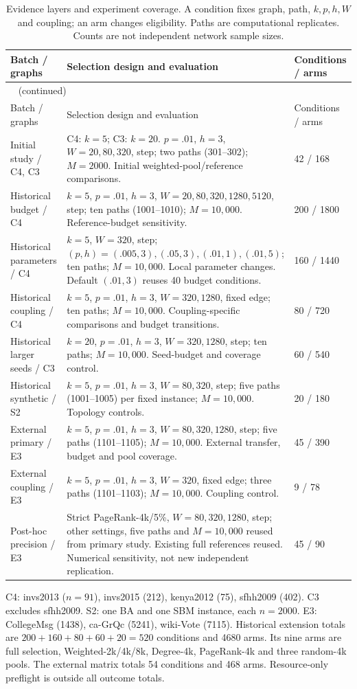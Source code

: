 \begin{longtable}{p{.23\linewidth}p{.51\linewidth}p{.14\linewidth}}
\caption{Evidence layers and experiment coverage. A condition fixes graph, path, $k,p,h,W$ and coupling; an arm changes eligibility. Paths are computational replicates. Counts are not independent network sample sizes.}\label{tab:hist-coverage}\\
\toprule Batch / graphs & Selection design and evaluation & Conditions / arms\\\midrule\endfirsthead
\multicolumn{3}{l}{\tablename~\thetable{} (continued)}\\\toprule
Batch / graphs & Selection design and evaluation & Conditions / arms\\\midrule\endhead\bottomrule\endfoot
Initial study / C4, C3 & C4: $k=5$; C3: $k=20$. $p=.01$, $h=3$, $W=20,80,320$, step; two paths (301--302); $M=2000$. Initial weighted-pool/reference comparisons. & 42 / 168\\
Historical budget / C4 & $k=5$, $p=.01$, $h=3$, $W=20,80,320,1280,5120$, step; ten paths (1001--1010); $M=10{,}000$. Reference-budget sensitivity. & 200 / 1800\\
Historical parameters / C4 & $k=5$, $W=320$, step; $(p,h)=(.005,3),(.05,3),(.01,1),(.01,5)$; ten paths; $M=10{,}000$. Local parameter changes. Default $(.01,3)$ reuses 40 budget conditions. & 160 / 1440\\
Historical coupling / C4 & $k=5$, $p=.01$, $h=3$, $W=320,1280$, fixed edge; ten paths; $M=10{,}000$. Coupling-specific comparisons and budget transitions. & 80 / 720\\
Historical larger seeds / C3 & $k=20$, $p=.01$, $h=3$, $W=320,1280$, step; ten paths; $M=10{,}000$. Seed-budget and coverage control. & 60 / 540\\
Historical synthetic / S2 & $k=5$, $p=.01$, $h=3$, $W=80,320$, step; five paths (1001--1005) per fixed instance; $M=10{,}000$. Topology controls. & 20 / 180\\
External primary / E3 & $k=5$, $p=.01$, $h=3$, $W=80,320,1280$, step; five paths (1101--1105); $M=10{,}000$. External transfer, budget and pool coverage. & 45 / 390\\
External coupling / E3 & $k=5$, $p=.01$, $h=3$, $W=320$, fixed edge; three paths (1101--1103); $M=10{,}000$. Coupling control. & 9 / 78\\
Post-hoc precision / E3 & Strict PageRank-4k/5\%, $W=80,320,1280$, step; other settings, five paths and $M=10{,}000$ reused from primary study. Existing full references reused. Numerical sensitivity, not new independent replication. & 45 / 90\\
\end{longtable}
\noindent C4: invs2013 ($n=91$), invs2015 (212), kenya2012 (75), sfhh2009 (402).
C3 excludes sfhh2009. S2: one BA and one SBM instance, each $n=2000$.
E3: CollegeMsg (1438), ca-GrQc (5241), wiki-Vote (7115).
Historical extension totals are $200+160+80+60+20=520$ conditions and 4680 arms.
Its nine arms are full selection, Weighted-2k/4k/8k, Degree-4k, PageRank-4k and three random-4k pools.
The external matrix totals 54 conditions and 468 arms. Resource-only preflight is outside all outcome totals.

